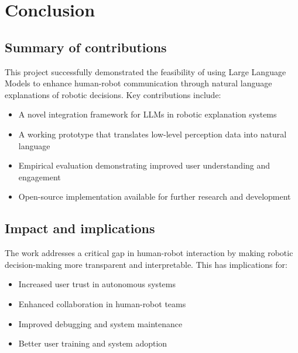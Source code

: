 \section{Conclusion}

\subsection{Summary of contributions}

This project successfully demonstrated the feasibility of using Large Language Models to enhance human-robot communication through natural language explanations of robotic decisions.
Key contributions include:

\begin{itemize}
    \item A novel integration framework for LLMs in robotic explanation systems
    \item A working prototype that translates low-level perception data into natural language
    \item Empirical evaluation demonstrating improved user understanding and engagement
    \item Open-source implementation available for further research and development
\end{itemize}

\subsection{Impact and implications}

The work addresses a critical gap in human-robot interaction by making robotic decision-making more transparent and interpretable.
This has implications for:
\begin{itemize}
    \item Increased user trust in autonomous systems
    \item Enhanced collaboration in human-robot teams
    \item Improved debugging and system maintenance
    \item Better user training and system adoption
\end{itemize}

